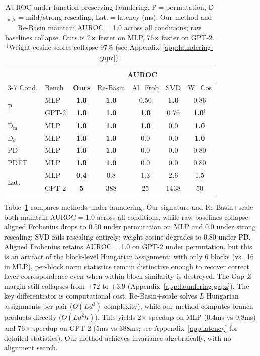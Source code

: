 \begin{table}[t]
\centering
\small
\setlength{\tabcolsep}{3pt}
\begin{tabular}{@{}llccccc@{}}
\toprule
& & \multicolumn{5}{c}{AUROC} \\
\cmidrule(lr){3-7}
Cond. & Bench & \textbf{Ours} & Re-Basin & Al.~Frob & SVD & W.~Cos \\
\midrule
\multirow{2}{*}{P}
  & MLP & \textbf{1.0} & \textbf{1.0} & 0.50 & \textbf{1.0} & 0.86 \\
  & GPT-2 & \textbf{1.0} & \textbf{1.0} & \textbf{1.0} & 0.76 & \textbf{1.0}$^\dagger$ \\
\midrule
D$_\mathrm{m}$ & MLP & \textbf{1.0} & \textbf{1.0} & \textbf{1.0} & 0.0 & \textbf{1.0} \\
D$_\mathrm{s}$ & MLP & \textbf{1.0} & \textbf{1.0} & 0.0 & 0.0 & \textbf{1.0} \\
PD & MLP & \textbf{1.0} & \textbf{1.0} & 0.0 & 0.0 & 0.80 \\
PDFT & MLP & \textbf{1.0} & \textbf{1.0} & 0.0 & 0.0 & 0.80 \\
\midrule
\multirow{2}{*}{Lat.}
  & MLP & \textbf{0.4} & 0.8 & 1.3 & 2.6 & 1.5 \\
  & GPT-2 & \textbf{5} & 388 & 25 & 1438 & 50 \\
\bottomrule
\end{tabular}
\caption{AUROC under function-preserving laundering. P$=$permutation, D$_\mathrm{m/s}$$=$mild/strong rescaling, Lat.$=$latency (ms). Our method and Re-Basin maintain AUROC$=$1.0 across all conditions; raw baselines collapse. Ours is 2$\times$ faster on MLP, 76$\times$ faster on GPT-2. $^\dagger$Weight cosine scores collapse 97\% (see Appendix~\ref{app:laundering-gapz}).}
\label{tab:laundering}
\end{table}

Table~\ref{tab:laundering} compares methods under laundering. Our signature and Re-Basin+scale both maintain AUROC$=$1.0 across all conditions, while raw baselines collapse: aligned Frobenius drops to 0.50 under permutation on MLP and 0.0 under strong rescaling; SVD fails rescaling entirely; weight cosine degrades to 0.80 under PD. Aligned Frobenius retains AUROC$=$1.0 on GPT-2 under permutation, but this is an artifact of the block-level Hungarian assignment: with only 6 blocks (vs.\ 16 in MLP), per-block norm statistics remain distinctive enough to recover correct layer correspondence even when within-block similarity is destroyed. The Gap-$Z$ margin still collapses from $+72$ to $+3.9$ (Appendix~\ref{app:laundering-gapz}). The key differentiator is computational cost. Re-Basin+scale solves $L$ Hungarian assignments per pair ($O(Ld^3)$ complexity), while our method computes branch products directly ($O(Ld^2 h)$). This yields 2$\times$ speedup on MLP (0.4ms vs 0.8ms) and 76$\times$ speedup on GPT-2 (5ms vs 388ms; see Appendix~\ref{app:latency} for detailed statistics). Our method achieves invariance algebraically, with no alignment search.

